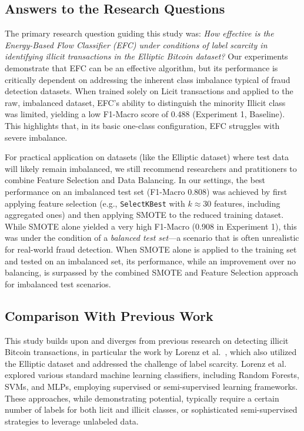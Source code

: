\documentclass[12pt]{article}
\begin{document}
\subsection{Answers to the Research Questions}\label{sec:answers}

The primary research question guiding this study was: \emph{How effective is the Energy-Based Flow Classifier (EFC) under
conditions of label scarcity in identifying illicit transactions in the Elliptic Bitcoin dataset?} Our experiments demonstrate
that EFC can be an effective algorithm, but its performance is critically dependent on addressing the inherent class imbalance
typical of fraud detection datasets. When trained solely on Licit transactions and applied to the raw, imbalanced dataset,
EFC's ability to distinguish the minority Illicit class was limited, yielding a low F1-Macro score of 0.488 (Experiment 1,
Baseline). This highlights that, in its basic one-class configuration, EFC struggles with severe imbalance.

For practical application on datasets (like the Elliptic dataset) where test data will likely remain imbalanced, we still
recommend researchers and pratitioners to combine Feature Selection and Data Balancing. In our settings, the best performance
on an imbalanced test set (F1-Macro 0.808) was achieved by first applying feature selection (e.g., \texttt{SelectKBest}
with $k \approx 30$ features, including aggregated ones) and then applying SMOTE to the reduced training dataset.
While SMOTE alone yielded a very high F1-Macro (0.908 in Experiment 1), this was under the condition of a \textit{balanced
test set}---a scenario that is often unrealistic for real-world fraud detection. When SMOTE alone is applied to the training
set and tested on an imbalanced set, its performance, while an improvement over no balancing, is surpassed by the combined
SMOTE and Feature Selection approach for imbalanced test scenarios.

\subsection{Comparison With Previous Work}\label{sec:comparision}
This study builds upon and diverges from previous research on detecting illicit Bitcoin transactions, in particular the
work by Lorenz et al.~\cite{lorenz2021machinelearningmethodsdetect}, which also utilized the Elliptic dataset and addressed the
challenge of label scarcity. Lorenz et al.~\cite{lorenz2021machinelearningmethodsdetect} explored various standard machine
learning classifiers, including Random Forests, SVMs, and MLPs, employing supervised or semi-supervised learning frameworks.
These approaches, while demonstrating potential, typically require a certain number of labels for both licit and illicit
classes, or sophisticated semi-supervised strategies to leverage unlabeled data.
\end{document}
